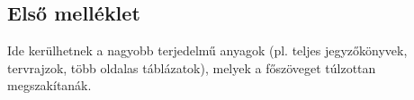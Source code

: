 \appendix
\chapter*{\melleklet}
\setcounter{chapter}{\annexletter} %
\setcounter{section}{0}

\section{Első melléklet}

Ide kerülhetnek a nagyobb terjedelmű anyagok (pl. teljes jegyzőkönyvek, tervrajzok, több oldalas táblázatok), melyek a főszöveget túlzottan megszakítanák.
